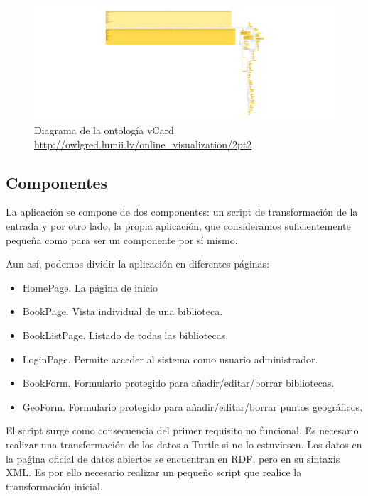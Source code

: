 \documentclass[12pt]{report} %
\begin{document}
\begin{figure}
    \centering
    \includegraphics[width=\textwidth]{vcard.png}
    \caption{Diagrama de la ontología vCard \\ \url{http://owlgred.lumii.lv/online_visualization/2pt2}}
    \label{fig:vcard}
\end{figure}

\subsection{Componentes}

La aplicación se compone de dos componentes: un script de transformación de la entrada y por otro lado, la propia aplicación, que consideramos suficientemente pequeña como para ser un componente por sí mismo.

Aun así, podemos dividir la aplicación en diferentes páginas:
\begin{itemize}
    \item HomePage. La página de inicio
    \item BookPage. Vista individual de una biblioteca.
    \item BookListPage. Listado de todas las bibliotecas.
    \item LoginPage. Permite acceder al sistema como usuario administrador.
    \item BookForm. Formulario protegido para añadir/editar/borrar bibliotecas.
    \item GeoForm. Formulario protegido para añadir/editar/borrar puntos geográficos.
\end{itemize}

El script surge como consecuencia del primer requisito no funcional. Es necesario realizar una transformación de los datos a Turtle si no lo estuviesen. Los datos en la paǵina oficial de datos abiertos se encuentran en RDF, pero en su sintaxis XML. Es por ello necesario realizar un pequeño script que realice la transformación inicial.
\end{document}
